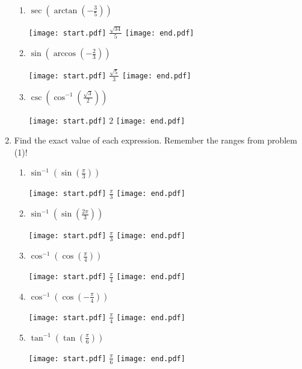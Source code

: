 \documentclass[12pt]{article}
\begin{document}
\begin{enumerate}
\begin{enumerate}
\item $\displaystyle \sec{\left(\arctan{\left(-\frac{3}{5}\right)}\right)}$

\texttt{[image: start.pdf]}
{$\displaystyle \frac{\sqrt{34}}{5}$}
\texttt{[image: end.pdf]}


\item $\displaystyle \sin{\left(\arccos{\left(-\frac{2}{3}\right)}\right)}$

\texttt{[image: start.pdf]}
{$\displaystyle \frac{\sqrt{5}}{3}$}
\texttt{[image: end.pdf]}


\item $\displaystyle \csc{\left(\cos^{-1}{\left(\frac{\sqrt{3}}{2}\right)}\right)}$

\texttt{[image: start.pdf]}
{$2$}
\texttt{[image: end.pdf]}


\end{enumerate}

\item Find the exact value of each expression.  Remember the ranges from problem (1)!

\begin{enumerate}

\item $\displaystyle \sin^{-1}{\left(\sin{\left(\frac{\pi}{3}\right)}\right)}$

\texttt{[image: start.pdf]}
{$\displaystyle \frac{\pi}{3}$}
\texttt{[image: end.pdf]}


\item $\displaystyle \sin^{-1}{\left(\sin{\left(\frac{2\pi}{3}\right)}\right)}$

\texttt{[image: start.pdf]}
{$\displaystyle \frac{\pi}{3}$}
\texttt{[image: end.pdf]}


\item $\displaystyle \cos^{-1}{\left(\cos{\left(\frac{\pi}{4}\right)}\right)}$

\texttt{[image: start.pdf]}
{$\displaystyle \frac{\pi}{4}$}
\texttt{[image: end.pdf]}


\item $\displaystyle \cos^{-1}{\left(\cos{\left(-\frac{\pi}{4}\right)}\right)}$

\texttt{[image: start.pdf]}
{$\displaystyle \frac{\pi}{4}$}
\texttt{[image: end.pdf]}


\item $\displaystyle \tan^{-1}{\left(\tan{\left(\frac{\pi}{6}\right)}\right)}$

\texttt{[image: start.pdf]}
{$\displaystyle \frac{\pi}{6}$}
\texttt{[image: end.pdf]}



\end{enumerate}
\end{enumerate}
\end{document}
